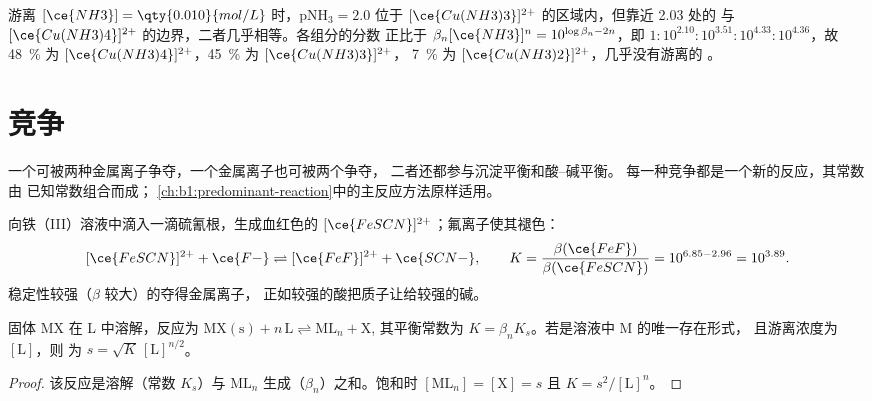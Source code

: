 \begin{example}\label{ex:b1:complexation:cu}
游离 $[\ce{NH3}] = \qty{0.010}{mol/L}$ 时，$\mathrm{pNH_3} = 2.0$ 位于
$[\ce{Cu(NH3)3}]^{2+}$ 的区域内，但靠近 2.03 处的
与 $[\ce{Cu(NH3)4}]^{2+}$ 的边界，二者几乎相等。各组分的分数
正比于 $\beta_n[\ce{NH3}]^n = 10^{\log\beta_n - 2n}$，即
$1 : 10^{2.10} : 10^{3.51} : 10^{4.33} : 10^{4.36}$，故 \qty{48}{\percent} 为
$[\ce{Cu(NH3)4}]^{2+}$，\qty{45}{\percent} 为 $[\ce{Cu(NH3)3}]^{2+}$，
\qty{7}{\percent} 为 $[\ce{Cu(NH3)2}]^{2+}$，几乎没有游离的 。
\end{example}

\section{竞争}

一个可被两种金属离子争夺，一个金属离子也可被两个争夺，
二者还都参与沉淀平衡和酸–碱平衡。
每一种竞争都是一个新的反应，其常数由
已知常数组合而成；
\cref{ch:b1:predominant-reaction}中的主反应方法原样适用。

\begin{example}\label{ex:b1:complexation:scn-f}
向铁（III）溶液中滴入一滴硫氰根，生成血红色的
$[\ce{FeSCN}]^{2+}$；氟离子使其褪色：
\[
  [\ce{FeSCN}]^{2+} + \ce{F-} \rightleftharpoons [\ce{FeF}]^{2+} + \ce{SCN-},
  \qquad K = \frac{\beta(\ce{FeF})}{\beta(\ce{FeSCN})} = 10^{6.85 - 2.96} =
  10^{3.89} .
\]
稳定性较强（$\beta$ 较大）的夺得金属离子，
正如较强的酸把质子让给较强的碱。
\end{example}

\begin{proposition}[配合作用与沉淀的竞争]\label{prop:b1:complexation:competition-precipitation}
固体 MX 在 L 中溶解，反应为
$\mathrm{MX(s)} + n\,\mathrm{L} \rightleftharpoons \mathrm{ML}_n + \mathrm{X}$,
其平衡常数为 $K = \beta_n K_s$。若是溶液中 M 的唯一存在形式，
且游离浓度为 $[\mathrm{L}]$，则
为 $s = \sqrt{K}\,[\mathrm{L}]^{n/2}$。
\end{proposition}

\begin{proof}
该反应是溶解（常数 $K_s$）与
$\mathrm{ML}_n$ 生成（$\beta_n$）之和。饱和时 $[\mathrm{ML}_n]
= [\mathrm{X}] = s$ 且 $K = s^2/[\mathrm{L}]^n$。
\end{proof}

